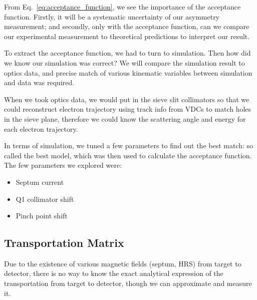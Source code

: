 From Eq.~\ref{eq:acceptance_function}, we see the importance of the acceptance
function. Firstly, it will be a systematic uncertainty of our asymmetry
measurement; and secondly, only with the acceptance function, can we compare
our experimental measurement to theoretical predictions to interpret our
result.

To extract the acceptance function, we had to turn to simulation. Then how
did we know our simulation was correct? We will compare the simulation result
to optics data, and precise match of various kinematic variables between simulation
and data was required. 

When we took optics data, we would put in the sieve slit collimators so that 
we could reconstruct electron trajectory using track info from VDCs 
to match holes in the sieve plane, therefore we could know the scattering angle and 
energy for each electron trajectory.

In terms of simulation, we tuned a few parameters to find out the best
match: so called the best model, which was then used to calculate the acceptance
function. The few parameters we explored were:
\begin{itemize}
    \item Septum current
    \item Q1 collimator shift
    \item Pinch point shift
\end{itemize}

\subsection{Transportation Matrix}
Due to the existence of various magnetic fields (septum, HRS) from target to detector, 
there is no way to know the exact analytical expression of the transportation
from target to detector, though we can approximate and measure it.

